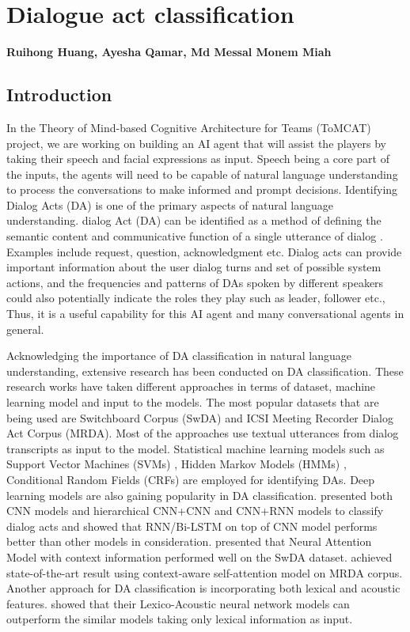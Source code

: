 \chapter{Dialogue act classification}
\label{ch:da_classification}
\textbf{Ruihong Huang, Ayesha Qamar, Md Messal Monem Miah}

\section{Introduction}

In the Theory of Mind-based Cognitive Architecture for Teams (ToMCAT) project,
we are working on building an AI agent that will assist the players by taking
their speech and facial expressions as input. Speech being a core part of the
inputs, the agents will need to be capable of natural language understanding to
process the conversations to make informed and prompt decisions. Identifying
Dialog Acts (DA) is one of the primary aspects of natural language
understanding. dialog Act (DA) can be identified as a method of defining the
semantic content and communicative function of a single utterance of dialog
\citep{Searle:1969}. Examples include request, question, acknowledgment etc.
Dialog acts can provide important information about the user dialog turns and
set of possible system actions, and the frequencies and patterns of DAs spoken
by different speakers could also potentially indicate the roles they play such
as leader, follower etc., Thus, it is a useful capability for this AI agent and
many conversational agents in general.

Acknowledging the importance of DA classification in natural language
understanding, extensive research has been conducted on DA classification.
These research works have taken different approaches in terms of dataset,
machine learning model and input to the models. The most popular datasets that
are being used are Switchboard Corpus (SwDA) and ICSI Meeting Recorder Dialog
Act Corpus (MRDA). Most of the approaches use textual utterances from dialog
transcripts as input to the model. Statistical machine learning models such as
Support Vector Machines (SVMs) \citep{Henderson.ea:2012}, Hidden Markov Models
(HMMs) \citep{Stolcke.ea:2000}, Conditional Random Fields (CRFs)
\citep{Zimmermann:2009} are employed for identifying DAs. Deep learning models
are also gaining popularity in DA classification. \citet{Liu.ea:2017} presented
both CNN models and hierarchical CNN+CNN and CNN+RNN models to classify dialog
acts and showed that RNN/Bi-LSTM on top of CNN model performs better than other
models in consideration. \citet{Shen.ea:2016} presented that Neural Attention
Model with context information performed well on the SwDA dataset.
\citet{Raheja.ea:2019} achieved state-of-the-art result using context-aware
self-attention model on MRDA corpus. Another approach for DA classification is
incorporating both lexical and acoustic features. \citet{Ortega.ea:2018} showed
that their Lexico-Acoustic neural network models can outperform the similar
models taking only lexical information as input.

